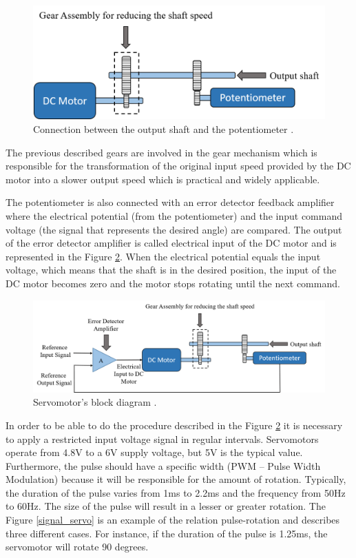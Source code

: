 \begin{figure}[H]
\centering
\includegraphics[scale=0.61]{figures/servomotor_expl2.png}
\caption{Connection between the output shaft and the potentiometer \cite{electrical4u}.}
\label{servomotor_expl2}
\end{figure}

The previous described gears are involved in the gear mechanism which is responsible for the transformation of the original input speed provided by the DC motor into a slower output speed which is practical and widely applicable. 

The potentiometer is also connected with an error detector feedback amplifier where the electrical potential (from the potentiometer) and the input command voltage (the signal that represents the desired angle) are compared. The output of the error detector amplifier is called electrical input of the DC motor and is represented in the Figure \ref{servomotor_expl3}. When the electrical potential equals the input voltage, which means that the shaft is in the desired position, the input of the DC motor becomes zero and the motor stops rotating until the next command.

\begin{figure}[H]
\centerline{
\includegraphics[scale=0.6]{figures/servomotor_expl3new.png}}
\caption{Servomotor’s block diagram \cite{electrical4u}.}
\label{servomotor_expl3}
\end{figure}

In order to be able to do the procedure described in the Figure \ref{servomotor_expl3} it is necessary to apply a restricted input voltage signal in regular intervals. Servomotors operate from 4.8V to a 6V supply voltage, but 5V is the typical value. Furthermore, the pulse should have a specific width (PWM – Pulse Width Modulation) because it will be responsible for the amount of rotation. Typically, the duration of the pulse varies from 1ms to 2.2ms and the frequency from 50Hz to 60Hz. The size of the pulse will result in a lesser or greater rotation. The Figure \ref{signal_servo} is an example of the relation pulse-rotation and describes three different cases. For instance, if the duration of the pulse is 1.25ms, the servomotor will rotate 90 degrees.

